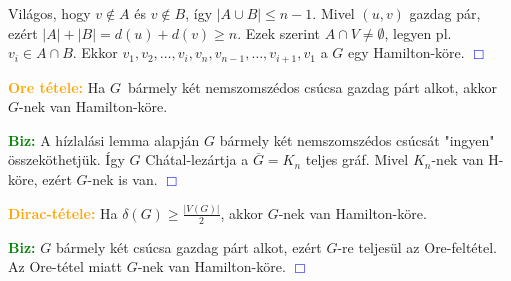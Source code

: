 \documentclass[../szamtud.tex]{subfiles}
\begin{document}
        Világos, hogy $v \notin A$ és $v \notin B$, így $|A \cup B| \leq n-1$. Mivel $(u,v)$ gazdag pár, ezért $|A|+|B| = d(u)+d(v) \geq n$. Ezek szerint $A \cap V \neq \emptyset$, legyen pl. $v_i \in A \cap B$. Ekkor $v_1, v_2, \dots, v_i, v_n, v_{n-1}, \dots, v_{i+1}, v_1$ a $G$ egy Hamilton-köre. \textcolor{blue}{$\Box$}

        \textcolor{orange}{\textbf{Ore tétele:}} Ha $G$ bármely két nemszomszédos csúcsa gazdag párt alkot, akkor $G$-nek van Hamilton-köre.

        \textcolor{green}{\textbf{Biz:}} A hízlalási lemma alapján $G$ bármely két nemszomszédos csúcsát "ingyen" összeköthetjük. Így $G$ Chátal-lezártja a $\overline{G} = K_n$ teljes gráf. Mivel $K_n$-nek van H-köre, ezért $G$-nek is van. \textcolor{blue}{$\Box$}

        \textcolor{orange}{\textbf{Dirac-tétele:}} Ha $\delta(G) \geq \frac{|V(G)|}{2}$, akkor $G$-nek van Hamilton-köre.

        \textcolor{green}{\textbf{Biz:}} $G$ bármely két csúcsa gazdag párt alkot, ezért $G$-re teljesül az Ore-feltétel. Az Ore-tétel miatt $G$-nek van Hamilton-köre. \textcolor{blue}{$\Box$}
\end{document}
